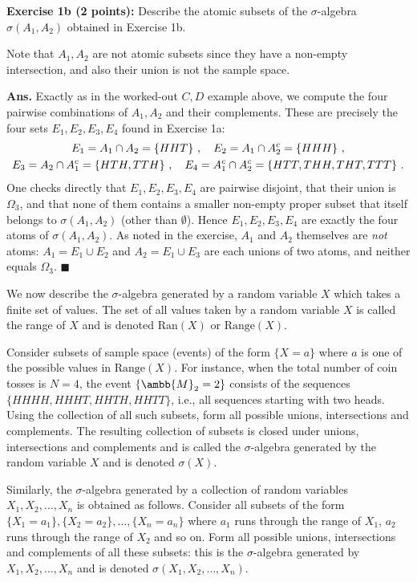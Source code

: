 \documentclass[12pt]{article} %
\newcommand{\mM}{\ambb{M}}
\newcommand{\Ans}{\textbf{Ans. }}
\begin{document}
\textbf{Exercise 1b (2 points):} Describe the atomic subsets of the
$\sigma$-algebra $\sigma(A_1, A_2)$ obtained in Exercise 1b.

Note that $A_1, A_2$ are not atomic subsets since they have a
non-empty intersection, and also their union is not the sample space.

\Ans Exactly as in the worked-out $C,D$ example above, we compute the
four pairwise combinations of $A_1, A_2$ and their complements. These
are precisely the four sets $E_1,E_2,E_3,E_4$ found in Exercise 1a:
\begin{gather}
  E_1 = A_1 \cap A_2 = \{HHT\}\ ,\quad E_2 = A_1 \cap A_2^c = \{HHH\}\ ,\notag\\
  E_3 = A_2 \cap A_1^c = \{HTH, TTH\}\ ,\quad E_4 = A_1^c \cap A_2^c = \{HTT, THH, THT, TTT\}\ .
\end{gather}
One checks directly that $E_1,E_2,E_3,E_4$ are pairwise disjoint, that
their union is $\Omega_3$, and that none of them contains a smaller
non-empty proper subset that itself belongs to $\sigma(A_1,A_2)$
(other than $\emptyset$). Hence $E_1,E_2,E_3,E_4$ are exactly the four
atoms of $\sigma(A_1,A_2)$. As noted in the exercise, $A_1$ and $A_2$
themselves are \emph{not} atoms: $A_1 = E_1 \cup E_2$ and
$A_2 = E_1 \cup E_3$ are each unions of two atoms, and neither equals
$\Omega_3$. \hfill$\blacksquare$

We now describe the $\sigma$-algebra generated by a random variable
$X$ which takes a finite set of values. The set of all values taken by
a random variable $X$ is called the range of $X$ and is denoted
$\text{Ran}(X)$ or $\text{Range}(X)$.

Consider subsets of sample space (events) of the form $\{X = a\}$
where $a$ is one of the possible values in $\text{Range}(X)$. For
instance, when the total number of coin tosses is $N = 4$, the event
$\{\mM_2 = 2\}$ consists of the sequences
$\{HHHH, HHHT, HHTH, HHTT\}$, i.e., all sequences starting with two
heads. Using the collection of all such subsets, form all possible
unions, intersections and complements. The resulting collection of
subsets is closed under unions, intersections and complements and is
called the $\sigma$-algebra generated by the random variable $X$ and
is denoted $\sigma(X)$.

Similarly, the $\sigma$-algebra generated by a collection of random
variables $X_1, X_2, \ldots, X_n$ is obtained as follows. Consider all
subsets of the form $\{X_1 = a_1\}, \{X_2 = a_2\}, \ldots, \{X_n =
a_n\}$ where $a_1$ runs through the range of $X_1$, $a_2$ runs through
the range of $X_2$ and so on. Form all possible unions, intersections
and complements of all these subsets: this is the $\sigma$-algebra
generated by $X_1, X_2, \ldots, X_n$ and is denoted
$\sigma(X_1, X_2, \ldots, X_n)$.
\end{document}
